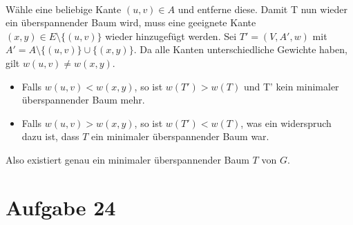 \documentclass[10pt,a4paper]{article}
\begin{document}
\paragraph{}
Wähle eine beliebige Kante $(u, v) \in A$ und entferne diese. Damit T nun wieder ein überspannender Baum wird, muss eine geeignete Kante $(x, y) \in E \setminus \{(u,v)\}$ wieder hinzugefügt werden.
Sei $T' = (V, A', w)$ mit $A' = A \setminus \{(u,v)\} \cup \{(x,y)\}$.
Da alle Kanten unterschiedliche Gewichte haben, gilt $w(u,v) \neq w(x, y)$.
\begin{itemize}
	\item Falls $w(u, v) < w(x, y)$, so ist $w(T') > w(T)$ und T' kein minimaler überspannender Baum mehr.
	\item Falls $w(u, v) > w(x, y)$, so ist $w(T') < w(T)$, was ein widerspruch dazu ist, dass $T$ ein minimaler überspannender Baum war.
\end{itemize}

Also existiert genau ein minimaler überspannender Baum $T$ von $G$.

\section*{Aufgabe 24}
\end{document}
